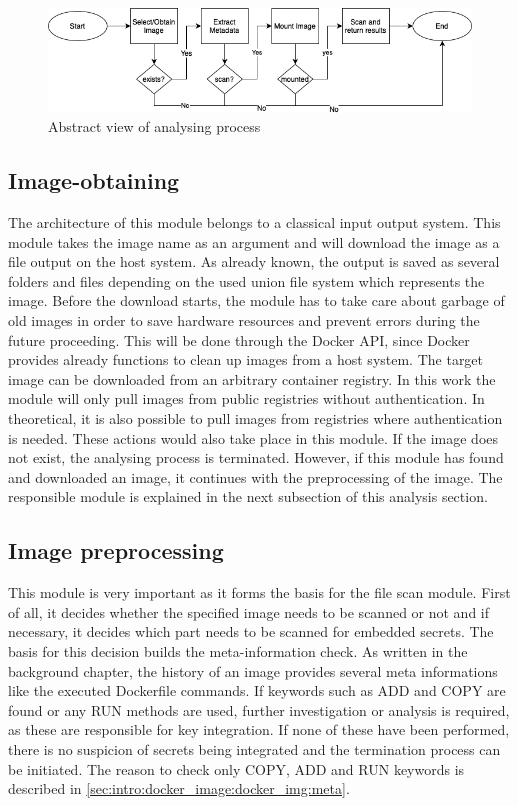 \begin{figure}[htbp]
\centering
\includegraphics[width=1.0\textwidth]{gfx/examples/basic_workflow_scan}
\caption{Abstract view of analysing process}
\label{ch:theory:analysing process:fig}
\end{figure}

\subsection{Image-obtaining}
\label{ch:theory:analysing_process:obtain}
The architecture of this module belongs to a classical input output system. This module takes the image name as an argument and will download the image as a file output on the host system. As already known, the output is saved as several folders and files depending on the used union file system which represents the image. Before the download starts, the module has to take care about garbage of old images in order to save hardware resources and prevent errors during the future proceeding. This will be done through the Docker API, since Docker provides already functions to clean up images from a host system.
The target image can be downloaded from an arbitrary container registry. In this work the module will only pull images from public registries without authentication. In theoretical, it is also possible to pull images from registries where authentication is needed. These actions would also take place in this module.
If the image does not exist, the analysing process is terminated.
However, if this module has found and downloaded an image, it continues with the preprocessing of the image. The responsible module is explained in the next subsection of this analysis section.

\subsection{Image preprocessing}
\label{ch:theory:analysing_process:prepro}
This module is very important as it forms the basis for the file scan module. First of all, it decides whether the specified image needs to be scanned or not and if necessary, it decides which part needs to be scanned for embedded secrets. The basis for this decision builds the meta-information check. As written in the background chapter, the history of an image provides several meta informations like the executed Dockerfile commands.
If keywords such as ADD and COPY are found or any RUN methods are used, further investigation or analysis is required, as these are responsible for key integration. If none of these have been performed, there is no suspicion of secrets being integrated and the termination process can be initiated.
The reason to check only COPY, ADD and RUN keywords is described in \ref{sec:intro:docker_image:docker_img:meta}. 


